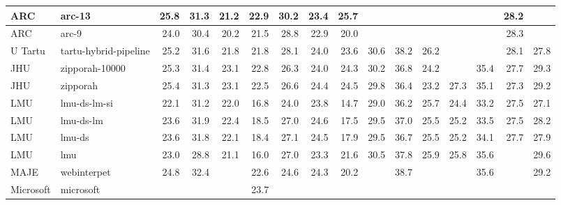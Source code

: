\begin{table*}
\begin{center}
\begin{tabular}{|l|l|rrrrrrr|rrrrrrr|}
ARC & arc-13 & 25.8 & 31.3 & 21.2 & 22.9 & 30.2 & 23.4 & 25.7 & \cellcolor{lightyellow}{31.3} & \cellcolor{lightyellow}{39.0} & \cellcolor{lightyellow}{26.6} & \cellcolor{lightyellow}{27.6} & \cellcolor{lightyellow}{36.0} & 28.2 & \cellcolor{lightgreen}{30.6} \\ \hline
ARC & arc-9 & 24.0 & 30.4 & 20.2 & 21.5 & 28.8 & 22.9 & 20.0 & \cellcolor{lightyellow}{31.3} & \cellcolor{lightyellow}{39.0} & \cellcolor{lightyellow}{26.5} & \cellcolor{lightyellow}{27.6} & \cellcolor{lightyellow}{35.8} & 28.3 & \cellcolor{lightgreen}{30.7} \\ \hline
U Tartu & tartu-hybrid-pipeline & 25.2 & 31.6 & 21.8 & 21.8 & 28.1 & 24.0 & 23.6 & 30.6 & 38.2 & 26.2 & \cellcolor{lightyellow}{27.5} & \cellcolor{lightyellow}{35.8} & 28.1 & 27.8 \\ \hline
JHU & zipporah-10000 & 25.3 & 31.4 & 23.1 & 22.8 & 26.3 & 24.0 & 24.3 & 30.2 & 36.8 & 24.2 & \cellcolor{lightyellow}{27.6} & 35.4 & 27.7 & 29.3 \\ \hline
JHU & zipporah & 25.4 & 31.3 & 23.1 & 22.5 & 26.6 & 24.4 & 24.5 & 29.8 & 36.4 & 23.2 & 27.3 & 35.1 & 27.3 & 29.2 \\ \hline
LMU & lmu-ds-lm-si & 22.1 & 31.2 & 22.0 & 16.8 & 24.0 & 23.8 & 14.7 & 29.0 & 36.2 & 25.7 & 24.4 & 33.2 & 27.5 & 27.1 \\ \hline
LMU & lmu-ds-lm & 23.6 & 31.9 & 22.4 & 18.5 & 27.0 & 24.6 & 17.5 & 29.5 & 37.0 & 25.5 & 25.2 & 33.5 & 27.5 & 28.2 \\ \hline
LMU & lmu-ds & 23.6 & 31.8 & 22.1 & 18.4 & 27.1 & 24.5 & 17.9 & 29.5 & 36.7 & 25.5 & 25.2 & 34.1 & 27.7 & 27.9 \\ \hline
LMU & lmu & 23.0 & 28.8 & 21.1 & 16.0 & 27.0 & 23.3 & 21.6 & 30.5 & 37.8 & 25.9 & 25.8 & 35.6 & \cellcolor{lightyellow}{28.5} & 29.6 \\ \hline
MAJE & webinterpet & 24.8 & 32.4 & \cellcolor{lightyellow}{24.8} & 22.6 & 24.6 & 24.3 & 20.2 & \cellcolor{lightyellow}{31.2} & 38.7 & \cellcolor{lightyellow}{26.9} & \cellcolor{lightyellow}{27.9} & 35.6 & \cellcolor{lightgreen}{28.9} & 29.2 \\ \hline
Microsoft & microsoft & \cellcolor{green}{28.6} & \cellcolor{lightgreen}{35.7} & \cellcolor{lightyellow}{25.1} & 23.7 & \cellcolor{green}{32.7} & \cellcolor{green}{26.7} & \cellcolor{lightgreen}{27.8} & \cellcolor{green}{32.1} & \cellcolor{green}{39.9} & \cellcolor{green}{27.4} & \cellcolor{lightgreen}{28.3} & \cellcolor{green}{36.7} & \cellcolor{green}{29.3} & \cellcolor{lightgreen}{30.8} \\ \hline

\end{tabular}
\end{center}
\end{table*}
